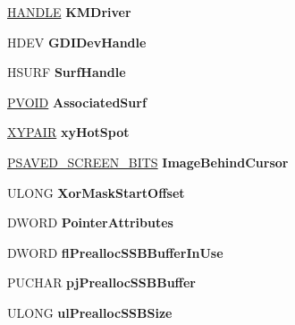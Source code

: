 \begin{DoxyCompactItemize}
\hyperlink{interfacevoid}{H\+A\+N\+D\+LE} {\bfseries K\+M\+Driver}
\item 
\mbox{\label{struct___p_d_e_v_a3b75760e3133c3935a7cbacb41e5e2ec}} 
H\+D\+EV {\bfseries G\+D\+I\+Dev\+Handle}
\item 
\mbox{\label{struct___p_d_e_v_a966c524b94243faa463142265990a3dc}} 
H\+S\+U\+RF {\bfseries Surf\+Handle}
\item 
\mbox{\label{struct___p_d_e_v_a95a6c0b0d7980d3e7a5bde750db918e6}} 
\hyperlink{interfacevoid}{P\+V\+O\+ID} {\bfseries Associated\+Surf}
\item 
\mbox{\label{struct___p_d_e_v_af54a4e6ca9a311e50083058bf3a868cd}} 
\hyperlink{struct___x_y_p_a_i_r}{X\+Y\+P\+A\+IR} {\bfseries xy\+Hot\+Spot}
\item 
\mbox{\label{struct___p_d_e_v_ae3ba8f51d3b28deed8308ced19b1554a}} 
\hyperlink{struct___s_a_v_e_d___s_c_r_e_e_n___b_i_t_s}{P\+S\+A\+V\+E\+D\+\_\+\+S\+C\+R\+E\+E\+N\+\_\+\+B\+I\+TS} {\bfseries Image\+Behind\+Cursor}
\item 
\mbox{\label{struct___p_d_e_v_a045a926dc596205410244bb5e41a3545}} 
U\+L\+O\+NG {\bfseries Xor\+Mask\+Start\+Offset}
\item 
\mbox{\label{struct___p_d_e_v_af4c4b597688cb906204dd7ee1354ca0e}} 
D\+W\+O\+RD {\bfseries Pointer\+Attributes}
\item 
\mbox{\label{struct___p_d_e_v_ac07faeccddb8d9a0b1a0a90f8701425b}} 
D\+W\+O\+RD {\bfseries fl\+Prealloc\+S\+S\+B\+Buffer\+In\+Use}
\item 
\mbox{\label{struct___p_d_e_v_a8d512e00f8076302a00f5d2b452d4628}} 
P\+U\+C\+H\+AR {\bfseries pj\+Prealloc\+S\+S\+B\+Buffer}
\item 
\mbox{\label{struct___p_d_e_v_abac28c0f0bcfb7790969e442541ae3ea}} 
U\+L\+O\+NG {\bfseries ul\+Prealloc\+S\+S\+B\+Size}
\item 
\mbox{\label{struct___p_d_e_v_a80e0e4bf4c9e23783092b955218f5a58}} 

\end{DoxyCompactItemize}
